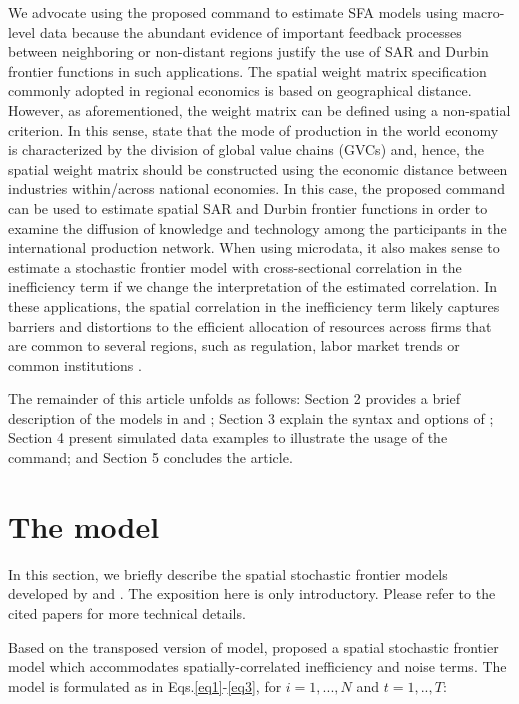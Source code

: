 We advocate using the proposed  command to estimate SFA models using macro-level data because the abundant evidence of important feedback processes between neighboring or non-distant regions justify the use of SAR and Durbin frontier functions in such applications. The spatial weight matrix specification commonly adopted in regional economics is based on geographical distance. However, as aforementioned, the weight matrix can be defined using a non-spatial criterion.  In this sense, \cite{liu2023industry} state that the mode of production in the world economy is characterized by the division of global value chains (GVCs) and, hence, the spatial weight matrix should be constructed using the economic distance between industries within/across national economies. In this case, the proposed  command can be used to estimate spatial SAR and Durbin frontier functions in order to examine the diffusion of knowledge and technology among the participants in the international production network. When using microdata, it also makes sense to estimate a stochastic frontier model with cross-sectional correlation in the inefficiency term if we change the interpretation of the estimated correlation. In these applications, the spatial correlation in the inefficiency term likely captures barriers and distortions to the efficient allocation of resources across firms that are common to several regions, such as regulation, labor market trends or common institutions \citep*[see e.g.,][]{orea2023industry}.  


The remainder of this article unfolds as follows: Section 2 provides a brief description of the models in \cite{orea2019new} and \cite{galli2022spatial}; Section 3 explain the syntax and options of ; Section 4  present simulated data examples to illustrate the usage of the command; and Section 5 concludes the article.


\section{The model}\label{sec_method}
\vspace{5pt}
In this section, we briefly describe the spatial stochastic frontier models developed by \cite{orea2019new} and \cite{galli2022spatial}. The exposition here is only introductory. Please refer to the cited papers for more technical details.  

Based on the transposed version of \cite{wang2010estimating} model, \cite{orea2019new}  proposed a spatial stochastic frontier model which accommodates spatially-correlated inefficiency and noise terms. The model is formulated as in Eqs.\eqref{eq1}-\eqref{eq3}, for $i=1,...,N$ and $t=1,..,T$:

